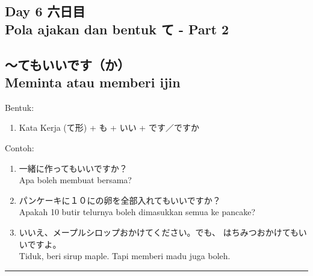 \begin{flushright}
    \section*{\Large{Day 6 六日目 \\
    Pola ajakan dan bentuk て - Part 2}}
\end{flushright}

\subsection*{
    ～てもいいです（か） \\ 
    Meminta atau memberi ijin
}
Bentuk:
\begin{enumerate}
    \item Kata Kerja (て形) + も + いい + です／ですか
\end{enumerate}
Contoh: 
\begin{enumerate}
    \item 一緒に作ってもいいですか？
    \\ Apa boleh membuat bersama?
    \item パンケーキに１０にの卵を全部入れてもいいですか？
    \\ Apakah 10 butir telurnya boleh dimasukkan semua ke pancake?
    \item いいえ、メープルシロップおかけてください。でも、
    はちみつおかけてもいいですよ。
    \\ Tiduk, beri sirup maple. Tapi memberi madu juga boleh.
\end{enumerate}

\vspace{0.2cm}\hrule height 1pt\vspace{0.2cm}


